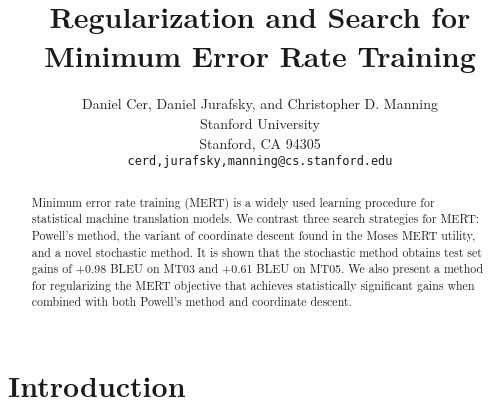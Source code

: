 \documentclass[11pt]{article}
\title{Regularization and Search for Minimum Error Rate Training}
\author{
Daniel Cer\textnormal{,} Daniel Jurafsky\textnormal{, and} Christopher D. Manning\\
Stanford University\\
Stanford, CA 94305\\
{\tt {cerd,jurafsky,manning}@cs.stanford.edu}
}
\date{}
\begin{document}
\maketitle
\begin{abstract}
Minimum error rate training (MERT) is a widely used learning procedure for statistical machine translation models. We contrast three search strategies for MERT: Powell's method, the variant of coordinate descent found in the Moses MERT utility, and a novel stochastic method. It is shown that the stochastic method obtains test set gains of +0.98 BLEU on MT03 and +0.61 BLEU on MT05. We also present a method for regularizing the MERT objective that achieves statistically significant gains when combined with both Powell's method and coordinate descent.
 
\end{abstract}

\section{Introduction}
\end{document}
